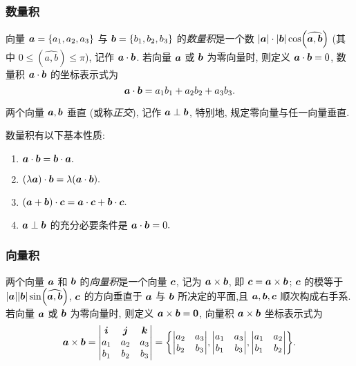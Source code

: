 \subsubsection{数量积}

\begin{definition}
    向量 $ \vb*{a}=\left\{a_{1}, a_{2}, a_{3}\right\} $ 与 $ \vb*{b}=\left\{b_{1}, b_{2}, b_{3}\right\} $ 的\textit{数量积}是一个数 $ |\vb*{a}| \cdot|\vb*{b}| \cos (\widehat{\vb*{a}, \vb*{b}}) $ (其中 $ 0 \leqslant(\widehat{a, b}) \leqslant \pi$), 
    记作 $ \vb*{a} \cdot \vb*{b} $. 若向量 $ \vb*{a} $ 或 $ \vb*{b} $ 为零向量时, 则定义 $ \vb*{a} \cdot \vb*{b}=0$, 数量积 $ \vb*{a} \cdot \vb*{b} $ 的坐标表示式为
    $$\vb*{a} \cdot \vb*{b}=a_{1} b_{1}+a_{2} b_{2}+a_{3} b_{3} .$$
\end{definition}

\begin{definition}[向量正交]
    两个向量 $ \vb*{a}, \vb*{b} $ 垂直 (或称\textit{正交}), 记作 $ \vb*{a} \perp \vb*{b} $, 特别地, 规定零向量与任一向量垂直.
\end{definition}

数量积有以下基本性质:
\begin{enumerate}[label=(\arabic{*})]
    \item $\vb*{a} \cdot \vb*{b}=\vb*{b} \cdot \vb*{a} .$
    \item  $(\lambda \vb*{a}) \cdot \vb*{b}=\lambda(\vb*{a} \cdot \vb*{b}) .$
    \item $(\vb*{a}+\vb*{b}) \cdot \vb*{c}=\vb*{a} \cdot \vb*{c}+\vb*{b} \cdot \vb*{c} .$
    \item $\vb*{a} \perp \vb*{b} $ 的充分必要条件是 $ \vb*{a} \cdot \vb*{b}=0 .$
\end{enumerate}

\subsubsection{向量积}

\begin{definition}
    两个向量 $ \vb*{a} $ 和 $ \vb*{b} $ 的\textit{向量积}是一个向量 $ \vb*{c} $, 记为 $ \vb*{a} \times \vb*{b} $, 
    即 $ \vb*{c}=\vb*{a} \times \vb*{b}$; $\vb*{c} $ 的模等于 $ |\vb*{a}||\vb*{b}| \sin (\widehat{\vb*{a}, \vb*{b}})$, $\vb*{c} $ 的方向垂直于 $ \vb*{a} $ 与 $ \vb*{b} $ 所决定的平面,且 $ \vb*{a}, \vb*{b}, \vb*{c} $ 顺次构成右手系.
    若向量 $ \vb*{a} $ 或 $ \vb*{b} $ 为零向量时, 则定义 $ \vb*{a} \times \vb*{b}=\mathbf{0} $, 向量积 $ \vb*{a} \times \vb*{b} $ 坐标表示式为
    $$
        \vb*{a} \times \vb*{b}=\mqty|\vb*{i} & \vb*{j} & \vb*{k} \\
            a_{1}   & a_{2}   & a_{3}   \\
            b_{1}   & b_{2}   & b_{3}|=\qty{
                \mqty|a_{2} & a_{3} \\
            b_{2} & b_{3}|,\mqty|a_{1} & a_{3} \\
            b_{1} & b_{3}|,\mqty|a_{1} & a_{2} \\
            b_{1} & b_{2}|
            }.
    $$
\end{definition}

